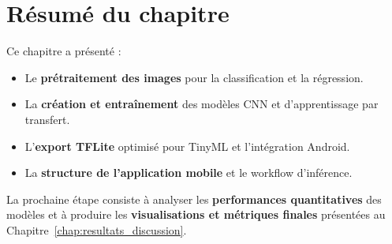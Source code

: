 \section{Résumé du chapitre}

Ce chapitre a présenté :

\begin{itemize}
	\item Le \textbf{prétraitement des images} pour la classification et la régression.
	\item La \textbf{création et entraînement} des modèles CNN et d’apprentissage par transfert.
	\item L’\textbf{export TFLite} optimisé pour TinyML et l’intégration Android.
	\item La \textbf{structure de l’application mobile} et le workflow d’inférence.
\end{itemize}

La prochaine étape consiste à analyser les \textbf{performances quantitatives} des modèles et à produire les \textbf{visualisations et métriques finales} présentées au Chapitre~\ref{chap:resultats_discussion}.
